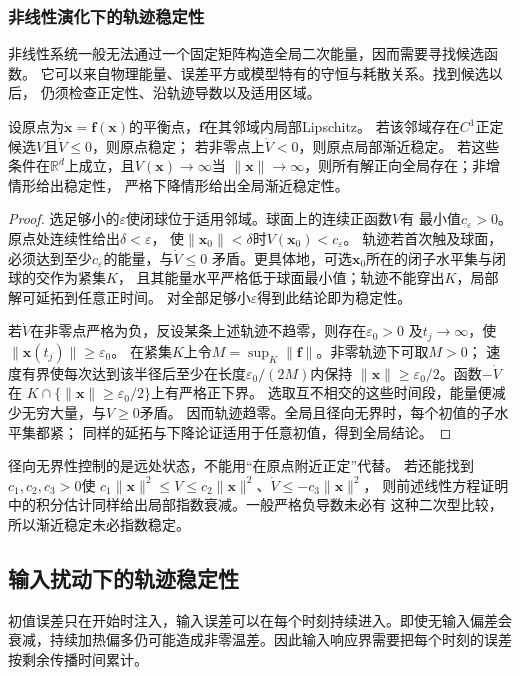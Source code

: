 \subsubsection{非线性演化下的轨迹稳定性}
\label{sec:action-state-nonlinear-stability}
非线性系统一般无法通过一个固定矩阵构造全局二次能量，因而需要寻找候选函数。
它可以来自物理能量、误差平方或模型特有的守恒与耗散关系。找到候选以后，
仍须检查正定性、沿轨迹导数以及适用区域。
\begin{theorem}[连续时间Lyapunov判据]
  \label{thm:dynamical-nonlinear-lyapunov}
  设原点为$\dot{\bm x}=\bm f(\bm x)$的平衡点，$\bm f$在其邻域内局部Lipschitz。
  若该邻域存在$C^1$正定候选$V$且$\dot V\leq0$，则原点稳定；
  若非零点上$\dot V<0$，则原点局部渐近稳定。
  若这些条件在$\mathbb R^d$上成立，且$V(\bm x)\to\infty$当
  $\|\bm x\|\to\infty$，则所有解正向全局存在；非增情形给出稳定性，
  严格下降情形给出全局渐近稳定性。
\end{theorem}
\begin{proof}
  选足够小的$\varepsilon$使闭球位于适用邻域。球面上的连续正函数$V$有
  最小值$c_\varepsilon>0$。原点处连续性给出$\delta<\varepsilon$，
  使$\|\bm x_0\|<\delta$时$V(\bm x_0)<c_\varepsilon$。
  轨迹若首次触及球面，必须达到至少$c_\varepsilon$的能量，与$\dot V\leq0$
  矛盾。更具体地，可选$\bm x_0$所在的闭子水平集与闭球的交作为紧集$K$，
  且其能量水平严格低于球面最小值；轨迹不能穿出$K$，局部解可延拓到任意正时间。
  对全部足够小$\varepsilon$得到此结论即为稳定性。

  若$\dot V$在非零点严格为负，反设某条上述轨迹不趋零，则存在$\varepsilon_0>0$
  及$t_j\to\infty$，使$\|\bm x(t_j)\|\geq\varepsilon_0$。
  在紧集$K$上令$M=\sup_K\|\bm f\|$。非零轨迹下可取$M>0$；
  速度有界使每次达到该半径后至少在长度$\varepsilon_0/(2M)$内保持
  $\|\bm x\|\geq\varepsilon_0/2$。函数$-\dot V$在
  $K\cap\{\|\bm x\|\geq\varepsilon_0/2\}$上有严格正下界。
  选取互不相交的这些时间段，能量便减少无穷大量，与$V\geq0$矛盾。
  因而轨迹趋零。全局且径向无界时，每个初值的子水平集都紧；
  同样的延拓与下降论证适用于任意初值，得到全局结论。
\end{proof}
径向无界性控制的是远处状态，不能用“在原点附近正定”代替。
若还能找到$c_1,c_2,c_3>0$使
$c_1\|\bm x\|^2\leq V\leq c_2\|\bm x\|^2$、$\dot V\leq-c_3\|\bm x\|^2$，
则前述线性方程证明中的积分估计同样给出局部指数衰减。一般严格负导数未必有
这种二次型比较，所以渐近稳定未必指数稳定。

\subsection{输入扰动下的轨迹稳定性}
初值误差只在开始时注入，输入误差可以在每个时刻持续进入。即使无输入偏差会衰减，持续加热偏多仍可能造成非零温差。因此输入响应界需要把每个时刻的误差按剩余传播时间累计。

